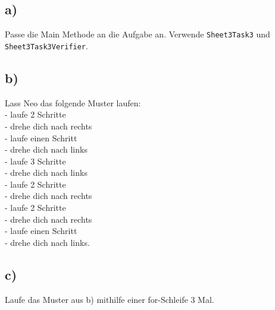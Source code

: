 \subsection*{a)}
	Passe die Main Methode an die Aufgabe an. Verwende \lstinline{Sheet3Task3} und \lstinline{Sheet3Task3Verifier}.
\subsection*{b)}
	Lass Neo das folgende Muster laufen:\\
	- laufe 2 Schritte\\
	- drehe dich nach rechts\\
	- laufe einen Schritt\\
	- drehe dich nach links\\
	- laufe 3 Schritte\\
	- drehe dich nach links\\
	- laufe 2 Schritte\\
	- drehe dich nach rechts\\
	- laufe 2 Schritte\\
	- drehe dich nach rechts\\
	- laufe einen Schritt\\
	- drehe dich nach links.
\subsection*{c)}
	Laufe das Muster aus b) mithilfe einer for-Schleife 3 Mal.
